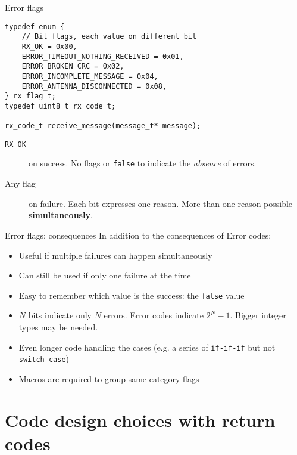 \documentclass[aspectratio=169,14pt]{beamer}
\begin{document}
\begin{frame}[fragile]{Error flags}
\begin{lstlisting}[style=cstyle]
typedef enum {
    // Bit flags, each value on different bit
    RX_OK = 0x00,
    ERROR_TIMEOUT_NOTHING_RECEIVED = 0x01,
    ERROR_BROKEN_CRC = 0x02,
    ERROR_INCOMPLETE_MESSAGE = 0x04,
    ERROR_ANTENNA_DISCONNECTED = 0x08,
} rx_flag_t;
typedef uint8_t rx_code_t;

rx_code_t receive_message(message_t* message);
\end{lstlisting}

\begin{description}
    \item[\texttt{RX\_OK}] on success. No flags or \texttt{false} to indicate the \textit{absence} of errors.
    \item[Any flag] on failure. Each bit expresses one reason. More than one reason possible \textbf{simultaneously}.
\end{description}
\end{frame}



\begin{frame}[fragile]{Error flags: consequences}
In addition to the consequences of Error codes:

\begin{itemize}
    \item[\good] Useful if multiple failures can happen simultaneously
    \item[\good] Can still be used if only one failure at the time
    \item[\good] Easy to remember which value is the success: the \texttt{false} value
    \item[\bad] \(N\) bits indicate only \(N\) errors. Error codes indicate \(2^N - 1\). Bigger integer types may be needed.
    \item[\bad] Even longer code handling the cases (e.g. a series of \texttt{if-if-if} but not \texttt{switch-case})
    \item[\bad] Macros are required to group same-category flags
\end{itemize}
\end{frame}





\section{Code design choices with return codes}
\end{document}
